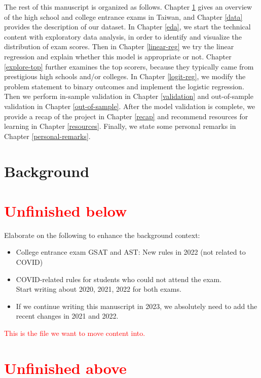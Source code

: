 \documentclass[
]{article}
\begin{document}
The rest of this manuscript is organized as follows. Chapter
\ref{background} gives an overview of the high school and college
entrance exams in Taiwan, and Chapter \ref{data} provides the
description of our dataset. In Chapter \ref{eda}, we start the technical
content with exploratory data analysis, in order to identify and
visualize the distribution of exam scores. Then in Chapter
\ref{linear-reg} we try the linear regression and explain whether this
model is appropriate or not. Chapter \ref{explore-top} further examines
the top scorers, because they typically came from prestigious high
schools and/or colleges. In Chapter \ref{logit-reg}, we modify the
problem statement to binary outcomes and implement the logistic
regression. Then we perform in-sample validation in Chapter
\ref{validation} and out-of-sample validation in Chapter
\ref{out-of-sample}. After the model validation is complete, we provide
a recap of the project in Chapter \ref{recap} and recommend resources
for learning in Chapter \ref{resources}. Finally, we state some personal
remarks in Chapter \ref{personal-remarks}.

\hypertarget{background}{%
\section{Background}\label{background}}

\section*{\textcolor{red}{Unfinished below}}

Elaborate on the following to enhance the background context:

\begin{itemize}
\item
  College entrance exam GSAT and AST: New rules in 2022 (not related to
  COVID)
\item
  COVID-related rules for students who could not attend the exam.\\
  Start writing about 2020, 2021, 2022 for both exams.
\item
  If we continue writing this manuscript in 2023, we absolutely need to
  add the recent changes in 2021 and 2022.
\end{itemize}

\textcolor{red}{This is the file we want to move content into.}

\section*{\textcolor{red}{Unfinished above}}
\end{document}
